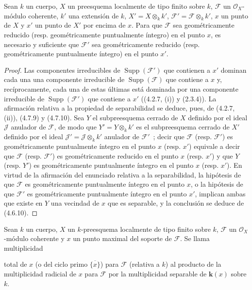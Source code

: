 \begin{proposition}[4.7.11]
\label{IV.2.4.7.11-fr}
Sean $k$ un cuerpo, $X$ un preesquema localmente de tipo finito sobre $k$,
$\mathscr F$ un $\mathcal O_X$-módulo coherente, $k'$ una extensión de $k$,
$X'=X\otimes_k k'$, $\mathscr F'=\mathscr F\otimes_k k'$, $x$ un punto de
$X$ y $x'$ un punto de $X'$ por encima de $x$. Para que $\mathscr F$ sea
geométricamente reducido \textup{(resp.} geométricamente puntualmente íntegro\textup{)} en el
punto $x$, es necesario y suficiente que $\mathscr F'$ sea geométricamente
reducido \textup{(resp.} geométricamente puntualmente íntegro\textup{)} en el punto $x'$.
\end{proposition}

\begin{proof}
Las componentes irreducibles de $\operatorname{Supp}(\mathscr F')$ que
contienen a $x'$ dominan cada una una componente irreducible de
$\operatorname{Supp}(\mathscr F)$ que contiene a $x$ y, recíprocamente, cada
una de estas últimas está dominada por una componente irreducible de
$\operatorname{Supp}(\mathscr F')$ que contiene a $x'$ ((4.2.7, (i)) y
(2.3.4)). La afirmación relativa a la propiedad de separabilidad se deduce,
pues, de (4.2.7, (ii)), (4.7.9) y (4.7.10). Sea $Y$ el subpreesquema cerrado
de $X$ definido por el ideal $\mathscr J$ anulador de $\mathscr F$, de modo
que $Y'=Y\otimes_k k'$ es el subpreesquema cerrado de $X'$ definido por el
ideal $\mathscr J'=\mathscr J\otimes_k k'$ anulador de $\mathscr F'$~; decir
que $\mathscr F$ (resp. $\mathscr F'$) es geométricamente puntualmente íntegro
en el punto $x$ (resp. $x'$) equivale a decir que $\mathscr F$ (resp.
$\mathscr F'$) es geométricamente reducido en el punto $x$ (resp. $x'$) y que
$Y$ (resp. $Y'$) es geométricamente puntualmente íntegro en el punto $x$
(resp. $x'$). En virtud de la afirmación del enunciado relativa a la
separabilidad, la hipótesis de que $\mathscr F$ es geométricamente puntualmente
íntegro en el punto $x$, o la hipótesis de que $\mathscr F'$ es
geométricamente puntualmente íntegro en el punto $x'$, implican ambas que
existe en $Y$ una vecindad de $x$ que es separable, y la conclusión se deduce de
(4.6.10).
\end{proof}

\begin{definition}[4.7.12]
\label{IV.2.4.7.12-fr}
Sean $k$ un cuerpo, $X$ un $k$-preesquema localmente de tipo finito sobre $k$,
$\mathscr F$ un $\mathcal O_X$-módulo coherente y $x$ un punto maximal del
soporte de $\mathscr F$. Se llama multiplicidad


total de $x$ (o del
ciclo primo $\overline{\{x\}}$) para $\mathscr F$ (relativa a $k$) al
producto de la multiplicidad radicial de $x$ para $\mathscr F$ por la
multiplicidad separable de $\boldsymbol{k}(x)$ sobre $k$.
\end{definition}

